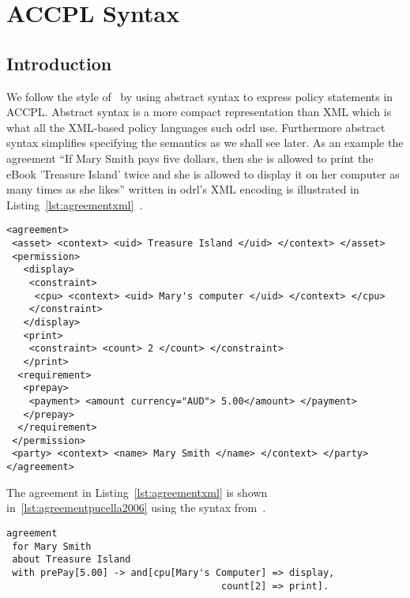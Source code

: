 \chapter{ACCPL Syntax}
\label{chap:odrl0syntax}

\section{Introduction}

We follow the style of~\cite{pucella2006} by using abstract syntax to express policy statements in \ac{ACCPL}. Abstract syntax is a more compact representation than XML which is what all the XML-based policy languages such \ac{odrl} use. Furthermore abstract syntax simplifies specifying the semantics as we shall see later. As an example the agreement ``If Mary Smith pays five dollars, then she is allowed to print the eBook 'Treasure Island' twice and she is allowed to display it on her computer as many times as she likes'' written in \ac{odrl}'s XML encoding is illustrated in Listing~\ref{lst:agreementxml}~\cite{pucella2006}. 


\lstset{language=XML}
\begin{lstlisting}[caption={Agreement for Mary Smith in XML},label={lst:agreementxml}]
<agreement>
 <asset> <context> <uid> Treasure Island </uid> </context> </asset>
 <permission>
   <display>
    <constraint>
     <cpu> <context> <uid> Mary's computer </uid> </context> </cpu>
    </constraint>
   </display>
   <print>
    <constraint> <count> 2 </count> </constraint>
   </print>
  <requirement>
   <prepay>
    <payment> <amount currency="AUD"> 5.00</amount> </payment>
   </prepay>
  </requirement>
 </permission>
 <party> <context> <name> Mary Smith </name> </context> </party>
</agreement>
\end{lstlisting}

The agreement in Listing~\ref{lst:agreementxml} is shown in~\ref{lst:agreementpucella2006} using the syntax from~\cite{pucella2006}.

\lstset{language=Pucella2006}
\begin{lstlisting}[frame=single, caption={Agreement for Mary Smith as BNF (as used in~\cite{pucella2006})},label={lst:agreementpucella2006}]
agreement
 for Mary Smith 
 about Treasure Island 
 with prePay[5.00] -> and[cpu[Mary's Computer] => display,
                                      count[2] => print].
\end{lstlisting}


